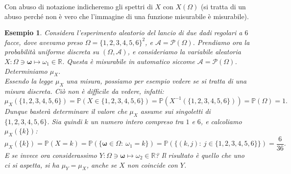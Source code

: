 \documentclass[11pt]{book}
\theoremstyle{Definizione}
\theoremstyle{TeoremaProposizioneLemmaCorollario}
\theoremstyle{OsservazioneNota}
\newtheorem{myes}{Esempio}[section]
\newcommand{\R}{\mathbb{R}}
\newcommand{\mybold}[1]{\boldsymbol{#1}}
\newcommand{\parti}[1]{\mathcal{P}\left({#1}\right)}
\renewcommand{\P}{\mathbb{P}}
\begin{document}
Con abuso di notazione indicheremo gli spettri di $X$ con $X(\Omega)$ (si tratta di un abuso perché non è vero che l'immagine di una funzione misurabile è misurabile).
\begin{myes}
Considera l'esperimento aleatorio del lancio di due dadi regolari a $6$ facce, dove avevamo preso $\Omega = \{1,2,3,4,5,6\}^2$, e $\mathcal{A} = \parti{\Omega}$. Prendiamo ora la probabilità uniforme discreta su $(\Omega,\mathcal{A})$, e consideriamo la variabile aleatoria $X:\Omega\ni\mybold{\omega}\longmapsto \omega_1\in \R$. Questa è misurabile in automatico siccome $\mathcal{A} = \parti{\Omega}$. Determiniamo $\mu_X$.\\
Essendo la legge $\mu_X$ una misura, possiamo per esempio vedere se si tratta di una misura discreta. Ciò non è difficile da vedere, infatti:
$$
\mu_X(\{1,2,3,4,5,6\}) = \P(X\in \{1,2,3,4,5,6\}) = \P(X^{-1}(\{1,2,3,4,5,6\})) = \P(\Omega) = 1.
$$
Dunque basterà determinare il valore che $\mu_X$ assume sui singoletti di $\{1,2,3,4,5,6\}$. Sia quindi $k$ un numero intero compreso tra $1$ e $6$, e calcoliamo $\mu_X(\{k\})$:
$$
\mu_X(\{k\}) = \P(X =k) = \P(\{\mybold{\omega}\in \Omega:\ \omega_1 = k\}) = \P(\{(k,j):\ j\in \{1,2,3,4,5,6\}\}) = \frac{6}{36}.
$$
E se invece ora considerassimo $Y:\Omega\ni \mybold{\omega}\longmapsto \omega_2\in \R$? Il risultato è quello che uno ci si aspetta, si ha $\mu_Y = \mu_X$, anche se $X$ non coincide con $Y$.
\end{myes}
\end{document}
